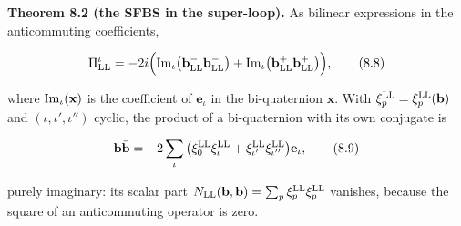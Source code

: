 \documentclass[
  10pt,
]{article}
\begin{document}
\textbf{Theorem 8.2 (the SFBS in the super-loop).} As bilinear
expressions in the anticommuting coefficients,

\[\Pi^\iota_{\rm LL}=-2i\Big({\rm Im}_\iota\big(\mathbf b^-_{\rm LL}\bar{\mathbf b}^-_{\rm LL}\big)+{\rm Im}_\iota\big(\mathbf b^+_{\rm LL}\bar{\mathbf b}^+_{\rm LL}\big)\Big),\tag{8.8}\]

where \({\rm Im}_\iota(\mathbf x)\) is the coefficient of
\(\mathbf e_\iota\) in the bi-quaternion \(\mathbf x\). With
\(\xi^{\rm LL}_p=\xi^{\rm LL}_p(\mathbf b)\) and
\((\iota,\iota',\iota'')\) cyclic, the product of a bi-quaternion with
its own conjugate is

\[\mathbf b\bar{\mathbf b}=-2\sum_\iota\big(\xi^{\rm LL}_0\xi^{\rm LL}_\iota+\xi^{\rm LL}_{\iota'}\xi^{\rm LL}_{\iota''}\big)\mathbf e_\iota,\tag{8.9}\]

purely imaginary: its scalar part
\(N_{\rm LL}(\mathbf b,\mathbf b)=\sum_p\xi^{\rm LL}_p\xi^{\rm LL}_p\)
vanishes, because the square of an anticommuting operator is zero.
\end{document}
